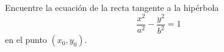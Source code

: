 \item Encuentre la ecuación de la recta tangente a la hipérbola
$$\frac{x^2}{a^2} - \frac{y^2}{b^2} = 1$$
en el punto $(x_0, y_0)$.
